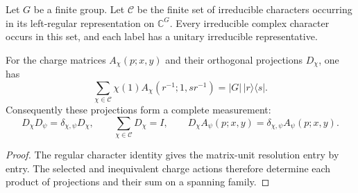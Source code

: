 \begin{definition}
    \label{def:peps_regular_charge_complete_labels}
    Let $G$ be a finite group. Let $\mathcal C$ be the finite set of irreducible
    characters occurring in its left-regular representation on $\mathbb C^G$.
    Every irreducible complex character occurs in this set, and each label has a
    unitary irreducible representative.
    \leanok
\end{definition}

\begin{lemma}
    \label{thm:peps_regular_charge_complete_measurement}
    For the charge matrices $A_\chi(p;x,y)$ and their orthogonal projections
    $D_\chi$, one has
    \[
        \sum_{\chi\in\mathcal C}\chi(1)A_\chi(r^{-1};1,sr^{-1})
        =|G|\,|r\rangle\langle s|.
    \]
    Consequently these projections form a complete measurement:
    \[
        D_\chi D_\psi=\delta_{\chi,\psi}D_\chi,
        \qquad \sum_{\chi\in\mathcal C}D_\chi=I,
        \qquad D_\chi A_\psi(p;x,y)=\delta_{\chi,\psi}A_\psi(p;x,y).
    \]
    \leanok
\end{lemma}
\begin{proof}
    \leanok
    The regular character identity gives the matrix-unit resolution entry by entry.
    The selected and inequivalent charge actions therefore determine each product
    of projections and their sum on a spanning family.
\end{proof}

